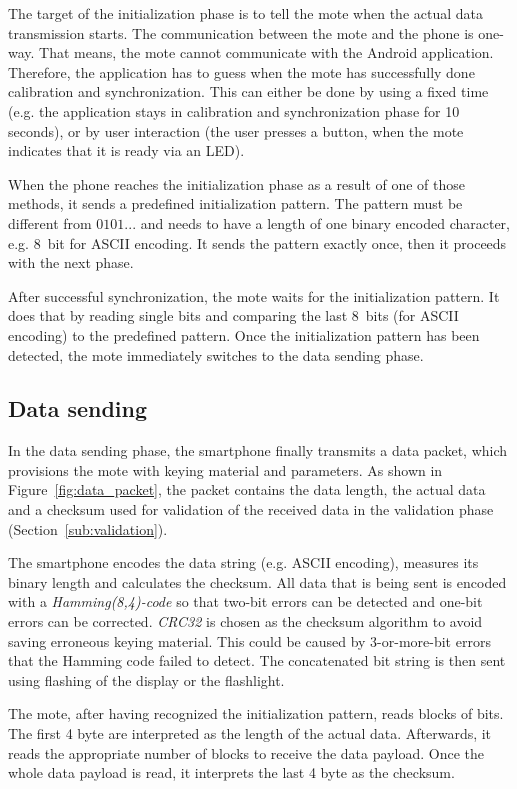 \documentclass{sig-alternate} %
\begin{document}
The target of the initialization phase is to tell the mote when the actual data transmission starts.
The communication between the mote and the phone is one-way.
That means, the mote cannot communicate with the Android application.
Therefore, the application has to guess when the mote has successfully done calibration and synchronization.
This can either be done by using a fixed time (e.g. the application stays in calibration and synchronization phase for 10 seconds), or by user interaction (the user presses a button, when the mote indicates that it is ready via an LED).

When the phone reaches the initialization phase as a result of one of those methods, it sends a predefined initialization pattern.
The pattern must be different from $0101...$ and needs to have a length of one binary encoded character, e.g. 8~bit for ASCII encoding.
It sends the pattern exactly once, then it proceeds with the next phase.

After successful synchronization, the mote waits for the initialization pattern.
It does that by reading single bits and comparing the last 8~bits (for ASCII encoding) to the predefined pattern.
Once the initialization pattern has been detected, the mote immediately switches to the data sending phase.

\subsection{Data sending}
\label{sub:data_sending}

In the data sending phase, the smartphone finally transmits a data packet, which provisions the mote with keying material and parameters.
As shown in Figure~\ref{fig:data_packet}, the packet contains the data length, the actual data and a checksum used for validation of the received data in the validation phase (Section~\ref{sub:validation}).

The smartphone encodes the data string (e.g. ASCII encoding), measures its binary length and calculates the checksum.
All data that is being sent is encoded with a \textit{Hamming(8,4)-code} so that two-bit errors can be detected and one-bit errors can be corrected.
\textit{CRC32} is chosen as the checksum algorithm to avoid saving erroneous keying material.
This could be caused by 3-or-more-bit errors that the Hamming code failed to detect.
The concatenated bit string is then sent using flashing of the display or the flashlight.

The mote, after having recognized the initialization pattern, reads blocks of bits.
The first 4 byte are interpreted as the length of the actual data.
Afterwards, it reads the appropriate number of blocks to receive the data payload.
Once the whole data payload is read, it interprets the last 4 byte as the checksum.
\end{document}
